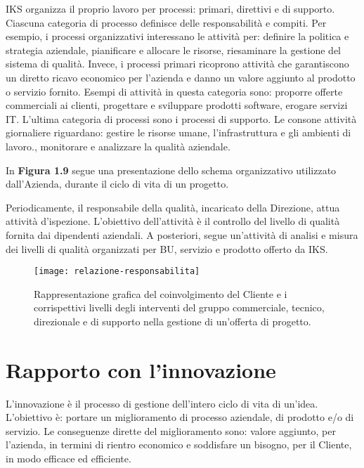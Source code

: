 IKS organizza il proprio lavoro per processi: primari, direttivi e di supporto. 
Ciascuna categoria di processo definisce delle responsabilità e compiti. 
Per esempio, i processi organizzativi interessano le attività per: definire la politica 
e strategia aziendale, pianificare e allocare le risorse, riesaminare la gestione del 
sistema di qualità. Invece, i processi primari ricoprono attività che garantiscono 
un diretto ricavo economico per l'azienda e danno un valore aggiunto al prodotto o 
servizio fornito. Esempi di attività in questa categoria sono: proporre offerte 
commerciali ai clienti, progettare e sviluppare prodotti software, erogare servizi IT. 
L'ultima categoria di processi sono i processi di supporto. Le consone attività giornaliere 
riguardano: gestire le risorse umane, l'infrastruttura 
e gli ambienti di lavoro., monitorare e analizzare la qualità aziendale. 

In \textbf{Figura 1.9} segue una presentazione dello schema organizzativo 
utilizzato dall'Azienda, durante il ciclo di vita di un progetto.

Periodicamente, il responsabile della qualità, incaricato della Direzione, attua 
attività d'ispezione. L'obiettivo dell'attività è il controllo del livello di qualità
fornita dai dipendenti aziendali. A posteriori, segue un'attività di 
analisi e misura dei livelli di qualità organizzati per BU, servizio e 
prodotto offerto da IKS.

\begin{figure}[htbp]
	\begin{center}
		\texttt{[image: relazione-responsabilita]}
		\caption{Rappresentazione grafica del coinvolgimento del 
		Cliente e i corrispettivi livelli degli interventi del gruppo 
		commerciale, tecnico, direzionale e di supporto nella gestione 
		di un'offerta di progetto.}
	\end{center}
\end{figure}


\section{Rapporto con l'innovazione}
L'innovazione è il processo di gestione dell'intero ciclo di vita di un'idea. 
L'obiettivo è: portare un miglioramento di processo aziendale, di prodotto e/o 
di servizio. Le conseguenze dirette del miglioramento sono: valore aggiunto, per 
l'azienda, in termini di rientro economico e soddisfare un 
bisogno, per il Cliente, in modo efficace ed efficiente. 

